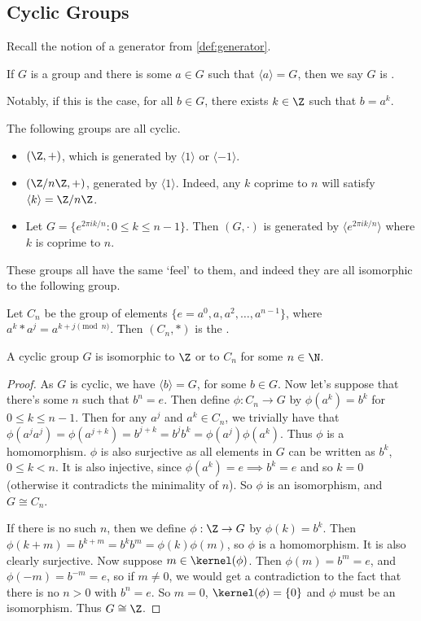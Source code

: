 \documentclass[a4paper]{scrartcl}
\newcommand{\newsection}{\subsection}
\begin{document}
\newsection{Cyclic Groups}

Recall the notion of a generator from \autoref{def:generator}.

\begin{definition}[Cyclic]
	If $G$ is a group and there is some $a \in G$ such that $\langle a \rangle = G$, then we say $G$ is . 
\end{definition}
Notably, if this is the case, for all $b \in G$, there exists $k \in \Z$ such that $b = a^k$.

\begin{example}
	The following groups are all cyclic.
	\begin{itemize}
		\item $(\Z, +)$, which is generated by $\langle 1 \rangle$ or $\langle -1 \rangle$.
		\item $(\Z/n\Z, +)$, generated by $\langle 1 \rangle$. Indeed, any $k$ coprime to $n$ will satisfy $\langle k \rangle = \Z/n\Z$.
		\item Let $G = \{ e^{2 \pi i k/n}  : 0 \leq k \leq n - 1 \}$. Then $(G, \cdot)$ is generated by $\langle e^{2 \pi i k/n}\rangle$ where $k$ is coprime to $n$.
	\end{itemize}
\end{example}
These groups all have the same `feel' to them, and indeed they are all isomorphic to the following group.

\begin{definition}
	Let $C_n$ be the group of elements $\{e = a^0, a, a^2, \dots, a^{n - 1}\}$, where $a^k * a^j = a^{k + j \pmod{n}}$. Then $(C_n, *)$ is the .
\end{definition}

\begin{theorem}
	A cyclic group $G$ is isomorphic to $\Z$ or to $C_n$ for some $n \in \N$.
\end{theorem}
\begin{proof}
	As $G$ is cyclic, we have $\langle b \rangle = G$, for some $b \in G$.
	Now let's suppose that there's some $n$ such that $b^n = e$. Then define $\phi: C_n \rightarrow G$ by $\phi(a^k) = b^k$ for $0 \leq k \leq n - 1$.
	Then for any $a^j$ and $a^k \in C_n$, we trivially have that $\phi(a^j a^j) = \phi(a^{j + k}) = b^{j + k} = b^j b^k = \phi(a^j) \phi(a^k)$. Thus $\phi$ is a homomorphism.
	$\phi$ is also surjective as all elements in $G$ can be written as $b^k$, $0 \leq k < n$. It is also injective, since $\phi(a^k) = e \implies b^k = e$ and so $k = 0$ (otherwise it contradicts the minimality of $n$). So $\phi$ is an isomorphism, and $G \cong C_n$.

	If there is no such $n$, then we define $\phi : \Z \rightarrow G$ by $\phi(k) = b^k$. Then $\phi(k + m) = b^{k + m} = b^k b^m = \phi(k) \phi(m)$, so $\phi$ is a homomorphism. It is also clearly surjective.
	Now suppose $m \in \kernel(\phi)$. Then $\phi(m) = b^m = e$, and $\phi(-m) = b^{-m} = e$, so if $m \neq 0$, we would get a contradiction to the fact that there is no $n > 0$ with $b^n = e$. So $m = 0$, $\kernel(\phi) = \{0\}$ and $\phi$ must be an isomorphism. Thus $G \cong \Z$.
\end{proof}
\end{document}
